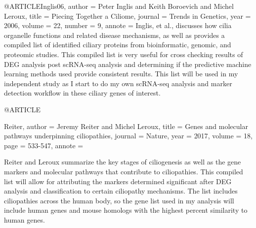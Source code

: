  @ARTICLE{Inglis06,
  author    = {Peter Inglis and Keith Boroevich and Michel Leroux},
  title     = {Piecing Together a Ciliome},
  journal   = {Trends in Genetics},
  year      = {2006},
  volume    = {22},
  number    = {9},
  annote    = {Inglis, et al., discusses how cilia organelle functions and related disease mechanisms, as well as provides a compiled list of identified ciliary proteins from bioinformatic, genomic, and proteomic studies. This compiled list is very useful for cross checking results of DEG analysis post scRNA-seq analysis and determining if the predictive machine learning methods used provide consistent results. This list will be used in my independent study as I start to do my own scRNA-seq analysis and marker detection workflow in these ciliary genes of interest. 
}
}

 @ARTICLE{Reiter,
  author    = {Jeremy Reiter and Michel Leroux},
  title     = {Genes and molecular pathways
underpinning ciliopathies},
  journal   = {Nature},
  year      = {2017},
  volume    = {18},
  page    = {533-547},
  annote    = {Reiter and Leroux summarize the key stages of ciliogenesis as well as the gene markers and molecular pathways that contribute to ciliopathies. This compiled list will allow for attributing the markers determined significant after DEG analysis and classification to certain ciliopathy mechanisms. The list includes ciliopathies across the human body, so the gene list used in my analysis will include human genes and mouse homologs with the highest percent similarity to human genes.

}
}
